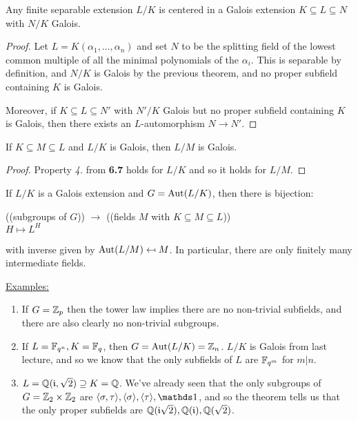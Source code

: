 \documentclass[10pt,a4paper]{article}
\begin{document}
\begin{corollary}
Any finite separable extension $L/K$ is centered in a Galois extension $K \subseteq L \subseteq N$ with $N/K$ Galois.
\end{corollary}
\begin{proof}
Let $L = K(\alpha_1, \ldots, \alpha_n)$ and set $N$ to be the splitting field of the lowest common multiple of all the minimal polynomials of the $\alpha_i$. This is separable by definition, and $N/K$ is Galois by the previous theorem, and no proper subfield containing $K$ is Galois.

Moreover, if $K \subseteq L \subseteq N'$ with $N'/K$ Galois but no proper subfield containing $K$ is Galois, then there exists an $L$-automorphism $N \to N'$.
\end{proof}
\begin{corollary}
If $K \subseteq M \subseteq L$ and $L/K$ is Galois, then $L/M$ is Galois.
\end{corollary}
\begin{proof}
Property \textit{4.} from \textbf{6.7} holds for $L/K$ and so it holds for $L/M$.
\end{proof}
\begin{theorem}
If $L/K$ is a Galois extension and $G = \operatorname{Aut}(L/K)$, then there is bijection:
\begin{center}
((subgroups of $G$)) $\to$ ((fields $M$ with $K \subseteq M \subseteq L$))\\
$H \mapsto L^H$
\end{center}
with inverse given by $\operatorname{Aut}(L/M)\mapsfrom M$. In particular, there are only finitely many intermediate fields.
\end{theorem}
\underline{Examples:}
\begin{enumerate}
\item If $G = \mathbb{Z}_p$ then the tower law implies there are no non-trivial subfields, and there are also clearly no non-trivial subgroups.
\item If $L = \mathbb{F}_{q^n}, K = \mathbb{F}_q$, then $G = \operatorname{Aut}(L/K) = \mathbb{Z}_n$. $L/K$ is Galois from last lecture, and so we know that the only subfields of $L$ are $\mathbb{F}_{q^m}$ for $m|n$.
\item $L = \mathbb{Q}(\mathfrak{i}, \sqrt{2}) \supseteq K = \mathbb{Q}$. We've already seen that the only subgroups of $G = \mathbb{Z}_2 \times \mathbb{Z}_2$ are $\angle{\sigma, \tau}, \angle{\sigma}, \angle{\tau}, \one$, and so the theorem tells us that the only proper subfields are $\mathbb{Q}(\mathfrak{i}\sqrt{2}), \mathbb{Q}(\mathfrak{i}), \mathbb{Q}(\sqrt{2})$.
\end{enumerate}
\end{document}
